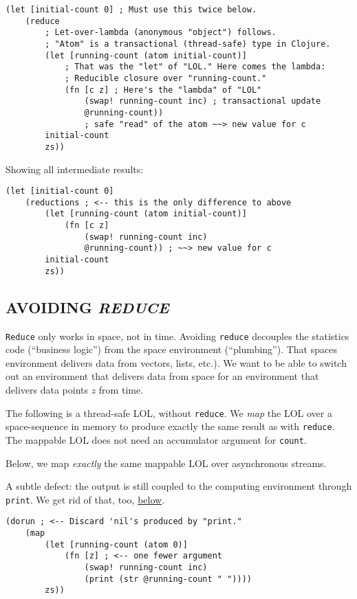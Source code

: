 \documentclass[10pt,oneside,x11names]{article}
\begin{document}
\begin{verbatim}
(let [initial-count 0] ; Must use this twice below.
    (reduce
        ; Let-over-lambda (anonymous "object") follows.
        ; "Atom" is a transactional (thread-safe) type in Clojure.
        (let [running-count (atom initial-count)]
            ; That was the "let" of "LOL." Here comes the lambda:
            ; Reducible closure over "running-count."
            (fn [c z] ; Here's the "lambda" of "LOL"
                (swap! running-count inc) ; transactional update
                @running-count))
                ; safe "read" of the atom ~~> new value for c
        initial-count
        zs))
\end{verbatim}

Showing all intermediate results:

\begin{verbatim}
(let [initial-count 0]
    (reductions ; <-- this is the only difference to above
        (let [running-count (atom initial-count)]
            (fn [c z]
                (swap! running-count inc)
                @running-count)) ; ~~> new value for c
        initial-count
        zs))
\end{verbatim}

\subsection{AVOIDING \emph{REDUCE}}
\label{avoiding-reduce}
\texttt{Reduce} only works in space, not in time. Avoiding \texttt{reduce} decouples
the statistics code (``business logic'') from the space environment
(``plumbing''). That spaces environment delivers data from vectors, lists,
etc.). We want to be able to switch out an environment that delivers
data from space for an environment that delivers data points \(z\) from
time.

The following is a thread-safe LOL, without \texttt{reduce}. We \emph{map} the LOL
over a space-sequence in memory to produce exactly the same result as
with \texttt{reduce}. The mappable LOL does not need an accumulator argument
for \texttt{count}.

Below, we map \emph{exactly} the same mappable LOL over asynchronous streams.

A subtle defect: the output is still coupled to the computing
environment through \texttt{print}. We get rid of that, too,
\hyperref[REMOVING-OUTPUT-COUPLING]{below}.

\begin{verbatim}
(dorun ; <-- Discard 'nil's produced by "print."
    (map
        (let [running-count (atom 0)]
            (fn [z] ; <-- one fewer argument
                (swap! running-count inc)
                (print (str @running-count " "))))
        zs))
\end{verbatim}
\end{document}
